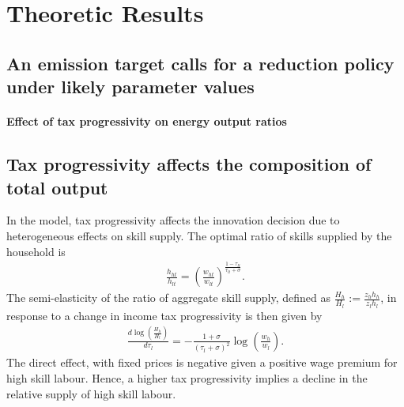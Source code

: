 \section{Theoretic Results}
\subsection{An emission target calls for a reduction policy under likely parameter values}

\paragraph{Effect of tax progressivity on energy output ratios}


\subsection{Tax progressivity affects the composition of total output}
In the model, tax progressivity affects the innovation decision due to heterogeneous effects on skill supply. 
The optimal ratio of skills supplied by the household is
\begin{align}
\frac{h_{ht}}{h_{lt}}=\left(\frac{w_{ht}}{w_{lt}}\right)^\frac{1-\tau_{lt}}{\tau_{lt}+\sigma}.
\end{align}
The semi-elasticity of the ratio of aggregate skill supply, defined as $\frac{H_h}{H_l}:=\frac{z_hh_h}{z_lh_l}$, in response to a change in income tax progressivity is then given by
\begin{align}
\frac{d\log\left(\frac{H_h}{H_l}\right)}{d\tau_l}=-\frac{1+\sigma}{(\tau_l+\sigma)^2}\log\left(\frac{w_{h}}{w_l}\right). \end{align}
The direct effect, with fixed prices is negative given a positive wage premium for high skill labour. Hence, a higher tax progressivity implies a decline in the relative supply of high skill labour. 

